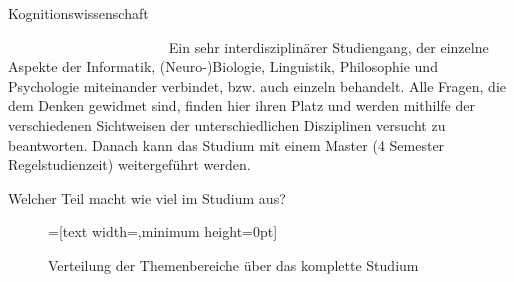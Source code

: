 


\begin{Huge}
    Kognitionswissenschaft
\end{Huge}

\begin{exampleblock}{\textcolor{white}{Was ist der Studiengang?}}
    Ein sehr interdisziplinärer Studiengang, der einzelne Aspekte der Informatik, (Neuro-)Biologie, Linguistik, Philosophie und Psychologie miteinander verbindet, bzw. auch einzeln behandelt. Alle Fragen, die dem Denken gewidmet sind, finden hier ihren Platz und werden mithilfe der verschiedenen Sichtweisen der unterschiedlichen Disziplinen versucht zu beantworten. Danach kann das Studium mit einem Master (4 Semester Regelstudienzeit) weitergeführt werden.
\end{exampleblock}

\begin{block}{Welcher Teil macht wie viel im Studium aus?}
    \begin{figure}[h!]
        \vspace{-10pt}
        \begin{minipage}{\linewidth}
            \centering
            =[text width={},minimum height=0pt]
        \end{minipage}
        \vspace{-20pt}
        \caption{Verteilung der Themenbereiche über das komplette Studium}
    \end{figure}
\end{block}

